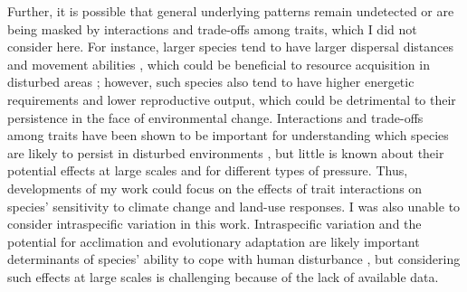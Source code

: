 Further, it is possible that general underlying patterns remain undetected or are being masked by interactions and trade-offs among traits, which I did not consider here. For instance, larger species tend to have larger dispersal distances and movement abilities \citep{Jenkins2007}, which could be beneficial to resource acquisition in disturbed areas \citep{Hillaert2018}; however, such species also tend to have higher energetic requirements \citep{White2011} and lower reproductive output, which could be detrimental to their persistence in the face of environmental change. Interactions and trade-offs among traits have been shown to be important for understanding which species are likely to persist in disturbed environments \citep{Sayol2020}, but little is known about their potential effects at large scales and for different types of pressure. Thus, developments of my work could focus on the effects of trait interactions on species' sensitivity to climate change and land-use responses. I was also unable to consider intraspecific variation in this work. Intraspecific variation and the potential for acclimation and evolutionary adaptation are likely important determinants of species' ability to cope with human disturbance \citep{Carlson2014, Rohr2018}, but considering such effects at large scales is challenging because of the lack of available data.  

